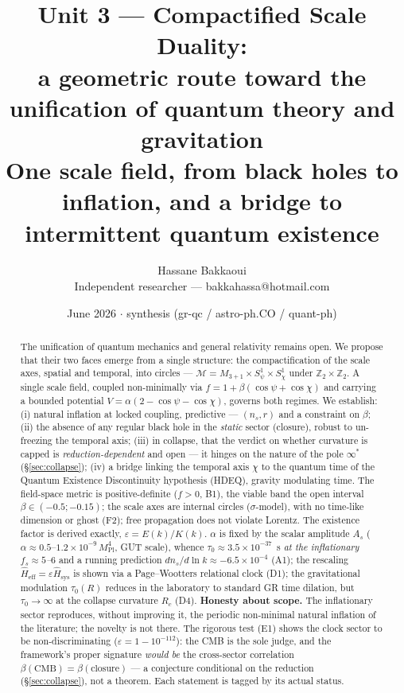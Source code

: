 \documentclass[11pt,a4paper]{article}
\title{\vspace{-1.0cm}\textbf{Unit 3 --- Compactified Scale Duality:\\
a geometric route toward the unification of quantum theory and gravitation}\\[5pt]
\large One scale field, from black holes to inflation, and a bridge to intermittent quantum existence}
\author{Hassane Bakkaoui\\ \small Independent researcher --- bakkahassa@hotmail.com}
\date{\small June 2026 $\cdot$ synthesis (gr-qc / astro-ph.CO / quant-ph)}
\newcommand{\Mpl}{M_{\mathrm{Pl}}}
\newcommand{\Heff}{\hat{H}_{\mathrm{eff}}}
\newcommand{\Hsys}{\hat{H}_{\mathrm{sys}}}
\theoremstyle{definition}
\begin{document}
\maketitle

\begin{abstract}
\noindent
The unification of quantum mechanics and general relativity remains open. We propose that
their two faces emerge from a single structure: the compactification of the scale axes,
spatial and temporal, into circles --- $\mathcal{M}=M_{3+1}\times S^1_\psi\times S^1_\chi$
under $\mathbb{Z}_2\times\mathbb{Z}_2$. A single scale field, coupled non-minimally via
$f=1+\beta(\cos\psi+\cos\chi)$ and carrying a bounded potential
$V=\alpha(2-\cos\psi-\cos\chi)$, governs both regimes. We establish: (i) natural inflation
at locked coupling, predictive --- $(n_s,r)$ and a constraint on $\beta$; (ii) the absence of
any regular black hole in the \emph{static} sector (closure), robust to un-freezing the
temporal axis; (iii) in collapse, that the verdict on whether curvature is capped is
\emph{reduction-dependent} and open --- it hinges on the nature of the pole $\infty^*$
(\S\ref{sec:collapse}); (iv) a bridge linking the temporal axis $\chi$ to the quantum time of
the Quantum Existence Discontinuity hypothesis (HDEQ), gravity modulating time.
The field-space metric is positive-definite ($f>0$, B1), the viable band the open interval
$\beta\in(-0.5;-0.15)$; the scale axes are internal circles ($\sigma$-model), with no
time-like dimension or ghost (F2); free propagation does not violate Lorentz. The existence
factor is derived exactly, $\varepsilon=E(k)/K(k)$. $\alpha$ is fixed by the scalar amplitude
$A_s$ ($\alpha\approx0.5$--$1.2\times10^{-9}\,\Mpl^4$, GUT scale), whence
$\tau_0\approx3.5\times10^{-37}$~s \emph{at the inflationary $f_s\approx5$--$6$} and a running
prediction $dn_s/d\ln k\approx-6.5\times10^{-4}$ (A1); the rescaling $\Heff=\varepsilon\Hsys$
is shown via a Page--Wootters relational clock (D1); the gravitational modulation $\tau_0(R)$
reduces in the laboratory to standard GR time dilation, but $\tau_0\to\infty$ at the collapse
curvature $R_c$ (D4). \textbf{Honesty about scope.} The inflationary sector reproduces,
without improving it, the periodic non-minimal natural inflation of the literature; the
novelty is not there. The rigorous test (E1) shows the clock sector to be non-discriminating
($\varepsilon=1-10^{-112}$): the CMB is the sole judge, and the framework's proper signature
\emph{would be} the cross-sector correlation $\beta(\mathrm{CMB})=\beta(\text{closure})$ ---
a conjecture conditional on the reduction (\S\ref{sec:collapse}), not a theorem. Each
statement is tagged by its actual status.


\end{abstract}
\end{document}
